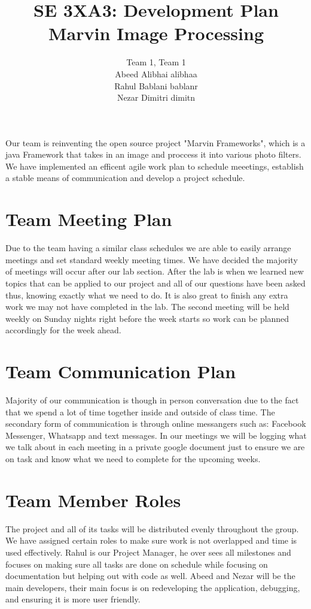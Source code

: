 \documentclass{article}
\begin{document}
\title{SE 3XA3: Development Plan \\ Marvin Image Processing}
\maketitle
\begin{center}
\author{Team 1, Team 1\\Abeed Alibhai alibhaa\\Rahul Bablani bablanr\\Nezar Dimitri dimitn}
\end{center}
Our team is reinventing the open source project "Marvin Frameworks", which is a java Framework that takes in an image and proccess it into various photo filters. We have implemented an efficent agile work plan to schedule meeetings, establish a stable means of communication and develop a project schedule.

\section{Team Meeting Plan}
Due to the team having a similar class schedules we are able to easily arrange meetings and set standard weekly meeting times. We have decided the majority of meetings will occur after our lab section. After the lab is when we learned new topics that can be applied to our project and all of our questions have been asked thus, knowing exactly what we need to do. It is also great to finish any extra work we may not have completed in the lab. The second meeting will be held weekly on Sunday nights right before the week starts so work can be planned accordingly for the week ahead.

\section{Team Communication Plan}
Majority of our communication is though in person conversation due to the fact that we spend a lot of time together inside and outside of class time. The secondary form of communication is through online messangers such as: Facebook Messenger, Whatsapp and text messages. In our meetings we will be logging what we talk about in each meeting in a private google document just to ensure we are on task and know what we need to complete for the upcoming weeks.

\section{Team Member Roles}
The project and all of its tasks will be distributed evenly throughout the group. We have assigned certain roles to make sure work is not overlapped and time is used effectively. Rahul is our Project Manager, he over sees all milestones and focuses on making sure all tasks are done on schedule while focusing on documentation but helping out with code as well. Abeed and Nezar will be the main developers, their main focus is on redeveloping the application, debugging,  and ensuring it is more user friendly.
\end{document}
